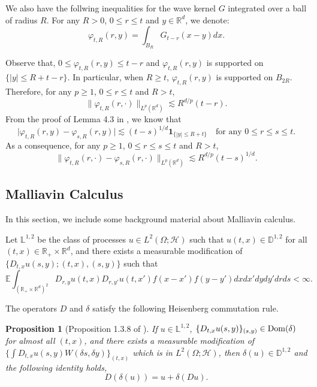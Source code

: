 \documentclass[12pt]{article}
\newtheorem{proposition}[theorem]{Proposition}
\def\cH{\mathcal{H}}
\def\bD{\mathbb{D}}
\def\bE{\mathbb{E}}
\def\bL{\mathbb{L}}
\def\bR{\mathbb{R}}
\newcommand{\les}{\lesssim}
\begin{document}
\bigskip 

We also have the follwing inequalities for the wave kernel $G$ integrated over a ball of radius $R$. 
For any $R>0$, $0\leq r \leq t$ and $y \in \bR^d$, we denote:
\begin{equation}
\label{def-var}
\varphi_{t,R}(r,y)=\int_{B_R} G_{t-r}(x-y)dx.
\end{equation}

Observe that, $0 \leq \varphi_{t,R}(r,y) \leq t-r$ and $\varphi_{t,R}(r,y)$ is supported on $\{|y| \leq R + t - r \}$. In particular, when $R \geq t$, $\varphi_{t,R}(r,y)$ is supported on $B_{2R}$. Therefore, for any $p\geq 1$, $0\leq r\leq t$ and $R>t$,
\begin{equation}
\label{est}
 \| \varphi_{t,R}(r,\cdot) \|_{L^p(\bR^d)} \les R^{d/p} (t-r).
\end{equation}
From the proof of Lemma 4.3 in \cite{NZ22}, we know that
\[
\Big|\varphi_{t,R}(r,y) - \varphi_{s,R}(r,y) \Big| \les (t-s)^{1/d} \mathbf 1_{\{|y|\leq R+t\}} \quad \mbox{for any $0\leq r\leq s\leq t$}.
\]
As a consequence, for any $p\geq 1$, $0\leq r\leq s\leq t$ and $R>t$,
\begin{equation}
\label{diff est}
 \| \varphi_{t,R}(r,\cdot) - \varphi_{s,R}(r,\cdot)\|_{L^p(\bR^d)} \les R^{d/p} (t-s)^{1/d}.
\end{equation}

\subsection{Malliavin Calculus}

In this section, we include some background material about Malliavin calculus.

\medskip

Let $\bL^{1,2}$ be the class of processes $u \in L^2(\Omega;\cH)$ such that $u(t,x)\in \bD^{1,2}$ for all $(t,x)\in \bR_{+}\times \bR^d$, and there exists a measurable modification of
$\{D_{t,x}u(s,y);(t,x),(s,y)\}$ such that
\[
\bE \int_{(\bR_+ \times \bR^d)^2} D_{r,y}u(t,x)D_{r,y'}u(t,x') f(x-x')f(y-y') dxdx'dydy'drds < \infty.
\]

The operators $D$ and $\delta$ satisfy the following Heisenberg commutation rule.
\begin{proposition}[Proposition 1.3.8 of \cite{nualart06}] If $u \in \bL^{1,2}$, $\{D_{t,x}u(s,y)\}_{(s,y)} \in {\rm Dom}(\delta)$ for almost all $(t,x)$, and there exists a measurable modification of $\{\int D_{t,x}u(s,y)W(\delta s,\delta y)\}_{(t,x)}$ which is in $L^2(\Omega;\cH)$, then $\delta(u) \in \bD^{1,2}$ and the following identity holds, 
\begin{equation}
\label{Heisenberg}
D(\delta(u))=u+\delta(Du).
\end{equation}
\end{proposition}
\end{document}
